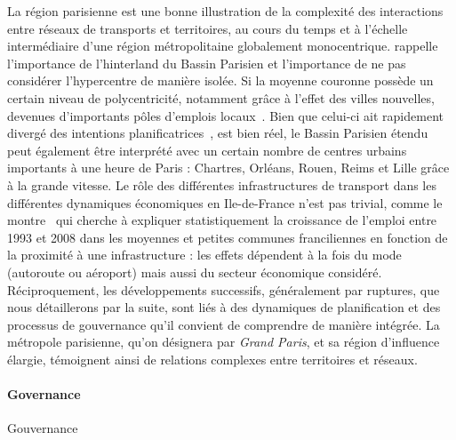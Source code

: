 La région parisienne est une bonne illustration de la complexité des interactions entre réseaux de transports et territoires, au cours du temps et à l'échelle intermédiaire d'une région métropolitaine globalement monocentrique. \cite{gilli2005bassin} rappelle l'importance de l'hinterland du Bassin Parisien et l'importance de ne pas considérer l'hypercentre de manière isolée. Si la moyenne couronne possède un certain niveau de polycentricité, notamment grâce à l'effet des villes nouvelles, devenues d'importants pôles d'emplois locaux~\cite{berroir2005contribution}. Bien que celui-ci ait rapidement divergé des intentions planificatrices~\cite{es119}, est bien réel, le Bassin Parisien étendu peut également être interprété avec un certain nombre de centres urbains importants à une heure de Paris : Chartres, Orléans, Rouen, Reims et Lille grâce à la grande vitesse. Le rôle des différentes infrastructures de transport dans les différentes dynamiques économiques en Ile-de-France n'est pas trivial, comme le montre~\cite{PADEIRO201344} qui cherche à expliquer statistiquement la croissance de l'emploi entre 1993 et 2008 dans les moyennes et petites communes franciliennes en fonction de la proximité à une infrastructure : les effets dépendent à la fois du mode (autoroute ou aéroport) mais aussi du secteur économique considéré. Réciproquement, les développements successifs, généralement par ruptures, que nous détaillerons par la suite, sont liés à des dynamiques de planification et des processus de gouvernance qu'il convient de comprendre de manière intégrée. La métropole parisienne, qu'on désignera par \emph{Grand Paris}, et sa région d'influence élargie, témoignent ainsi de relations complexes entre territoires et réseaux.




\paragraph{Governance}{Gouvernance}

